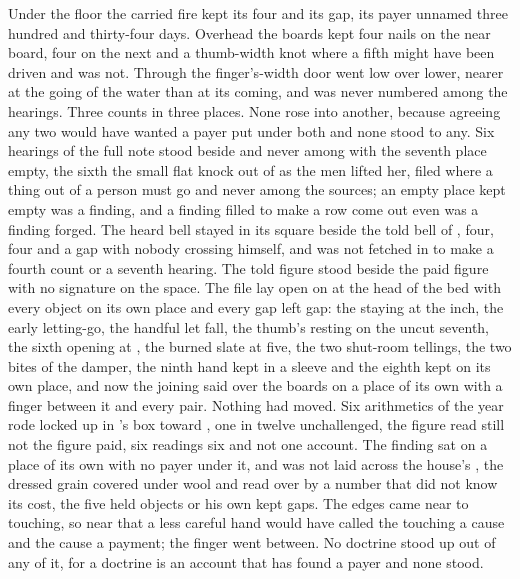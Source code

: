 Under the floor the carried fire kept its four and its gap, its payer unnamed three hundred and thirty-four days. Overhead the boards kept four nails on the near board, four on the next and a thumb-width knot where a fifth might have been driven and was not. Through the finger's-width door  went low over lower, nearer at the going of the water than at its coming, and was never numbered among the hearings. Three counts in three places. None rose into another, because agreeing any two would have wanted a payer put under both and none stood to any. Six hearings of the full note stood beside and never among with the seventh place empty, the sixth the small flat knock out of  as the men lifted her, filed where a thing out of a person must go and never among the sources; an empty place kept empty was a finding, and a finding filled to make a row come out even was a finding forged. The heard bell stayed in its square beside the told bell of , four, four and a gap with nobody crossing himself, and was not fetched in to make a fourth count or a seventh hearing. The told figure stood beside the paid figure with no signature on the space. The file lay open on  at the head of the bed with every object on its own place and every gap left gap: the staying at the inch, the early letting-go, the handful let fall, the thumb's resting on the uncut seventh, the sixth opening at , the burned slate at five, the two shut-room tellings, the two bites of the damper, the ninth hand kept in a sleeve and the eighth kept on its own place, and now the joining said over the boards on a place of its own with a finger between it and every pair. Nothing had moved. Six arithmetics of the year rode locked up  in 's box toward , one in twelve unchallenged, the figure read still not the figure paid, six readings six and not one account. The finding sat on a place of its own with no payer under it, and was not laid across the house's , the dressed grain covered under wool and read over by a number that did not know its cost, the five held objects or his own kept gaps. The edges came near to touching, so near that a less careful hand would have called the touching a cause and the cause a payment; the finger went between. No doctrine stood up out of any of it, for a doctrine is an account that has found a payer and none stood.

